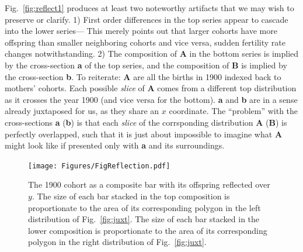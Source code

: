 \documentclass{article}
\begin{document}
Fig.~\ref{fig:reflect1} produces at least two noteworthy artifacts that we may wish to preserve or clarify. 1) First order differences in the top series appear to cascade into the lower series--- This merely points out that larger cohorts have more offspring than smaller neighboring cohorts and vice versa, sudden fertility rate changes notwithstanding. 2) The composition of \textbf{A} in the bottom series is implied by the cross-section \textbf{a} of the top series, and the composition of  \textbf{B} is implied by the cross-section \textbf{b}. To reiterate: \textbf{A} are all the births in 1900 indexed back to mothers' cohorts. Each possible \emph{slice} of \textbf{A} comes from a different top distribution as it crosses the year 1900 (and vice versa for the bottom). \textbf{a} and \textbf{b} are in a sense already juxtaposed for us, as they share an $x$ coordinate. The ``problem'' with the cross-sections \textbf{a} (\textbf{b}) is that each \emph{slice} of the corrsponding distribution \textbf{A} (\textbf{B}) is perfectly overlapped, such that it is just about impossible to imagine what \textbf{A} might look like if presented only with \textbf{a} and its surroundings. 
\pagebreak
\begin{figure}
 \centering
        \texttt{[image: Figures/FigReflection.pdf]}
        \caption{The 1900 cohort as a composite bar with its offspring reflected over $y$. The size of each bar stacked in the top composition is proportionate to the area of its corresponding polygon in the left distribution of Fig.~\ref{fig:juxt}. The size of each bar stacked in the lower composition is proportionate to the area of its corresponding polygon in the right distribution of Fig.~\ref{fig:juxt}.}
          \label{fig:refl}
\end{figure}
\end{document}
